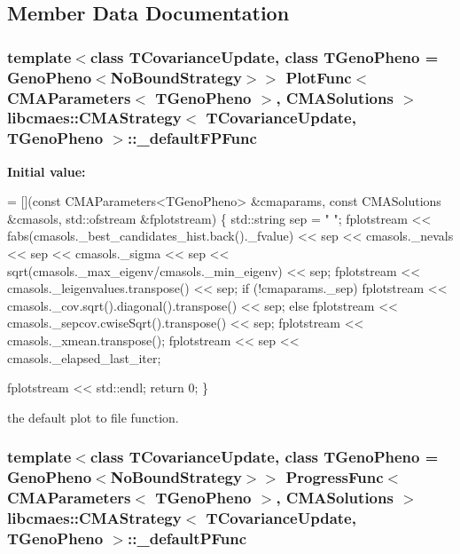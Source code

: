 \subsection{Member Data Documentation}
\hypertarget{classlibcmaes_1_1CMAStrategy_a0fcdccd9451a2dc509ee651f664ac31f}{
\subsubsection[{\-\_\-default\-F\-P\-Func}]{\setlength{\rightskip}{0pt plus 5cm}template$<$class T\-Covariance\-Update, class T\-Geno\-Pheno = Geno\-Pheno$<$\-No\-Bound\-Strategy$>$$>$ Plot\-Func$<$ {\bf C\-M\-A\-Parameters}$<$ T\-Geno\-Pheno $>$, {\bf C\-M\-A\-Solutions} $>$ {\bf libcmaes\-::\-C\-M\-A\-Strategy}$<$ T\-Covariance\-Update, T\-Geno\-Pheno $>$\-::\-\_\-default\-F\-P\-Func\hspace{0.3cm}{\ttfamily [static]}}}\label{classlibcmaes_1_1CMAStrategy_a0fcdccd9451a2dc509ee651f664ac31f}
{\bfseries Initial value\-:}
\begin{DoxyCode}
= [](\textcolor{keyword}{const} CMAParameters<TGenoPheno> &cmaparams, \textcolor{keyword}{const} CMASolutions &cmasols, std::ofstream &fplotstream)
  \{
    std::string sep = \textcolor{stringliteral}{" "};
    fplotstream << fabs(cmasols.\_best\_candidates\_hist.back().\_fvalue) << sep << cmasols.\_nevals << sep << 
      cmasols.\_sigma << sep << sqrt(cmasols.\_max\_eigenv/cmasols.\_min\_eigenv) << sep;
    fplotstream << cmasols.\_leigenvalues.transpose() << sep;
    \textcolor{keywordflow}{if} (!cmaparams.\_sep)
      fplotstream << cmasols.\_cov.sqrt().diagonal().transpose() << sep; 
    \textcolor{keywordflow}{else} fplotstream << cmasols.\_sepcov.cwiseSqrt().transpose() << sep;
    fplotstream << cmasols.\_xmean.transpose();
    fplotstream << sep << cmasols.\_elapsed\_last\_iter;



    fplotstream << std::endl;
    \textcolor{keywordflow}{return} 0;
  \}
\end{DoxyCode}
the default plot to file function. \hypertarget{classlibcmaes_1_1CMAStrategy_af6d980c670eef47ee810645739999d5b}{
\subsubsection[{\-\_\-default\-P\-Func}]{\setlength{\rightskip}{0pt plus 5cm}template$<$class T\-Covariance\-Update, class T\-Geno\-Pheno = Geno\-Pheno$<$\-No\-Bound\-Strategy$>$$>$ Progress\-Func$<$ {\bf C\-M\-A\-Parameters}$<$ T\-Geno\-Pheno $>$, {\bf C\-M\-A\-Solutions} $>$ {\bf libcmaes\-::\-C\-M\-A\-Strategy}$<$ T\-Covariance\-Update, T\-Geno\-Pheno $>$\-::\-\_\-default\-P\-Func\hspace{0.3cm}{\ttfamily [static]}}}\label{classlibcmaes_1_1CMAStrategy_af6d980c670eef47ee810645739999d5b}
